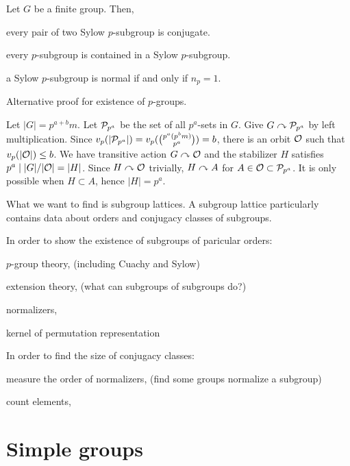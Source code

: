 \documentclass{../exp}
\begin{document}
\begin{cor}
Let $G$ be a finite group.
Then,
\begin{cond}
\item every pair of two Sylow $p$-subgroup is conjugate.
\item every $p$-subgroup is contained in a Sylow $p$-subgroup.
\item a Sylow $p$-subgroup is normal if and only if $n_p=1$.
\end{cond}
\end{cor}

\begin{thm}
Alternative proof for existence of $p$-groups.
\end{thm}
\begin{pf}
Let $|G|=p^{a+b}m$.
Let $\mathcal{P}_{p^a}$ be the set of all $p^a$-sets in $G$.
Give $G\curvearrowright\mathcal{P}_{p^a}$ by left multiplication.
Since $v_p(|\mathcal{P}_{p^a}|)=v_p({p^a(p^bm)\choose p^a})=b$, there is an orbit $\mathcal{O}$ such that $v_p(|\mathcal{O}|)\le b$.
We have transitive action $G\curvearrowright\mathcal{O}$ and the stabilizer $H$ satisfies $p^a\mid|G|/|\mathcal{O}|=|H|$.
Since $H\curvearrowright\mathcal{O}$ trivially, $H\curvearrowright A$ for $A\in\mathcal{O}\subset\mathcal{P}_{p^a}$.
It is only possible when $H\subset A$, hence $|H|=p^a$.
\end{pf}


What we want to find is subgroup lattices.
A subgroup lattice particularly contains data about orders and conjugacy classes of subgroups.

In order to show the existence of subgroups of paricular orders:
\begin{cond}
\item $p$-group theory, (including Cuachy and Sylow)
\item extension theory, (what can subgroups of subgroups do?)
\item normalizers,
\item kernel of permutation representation
\end{cond}

In order to find the size of conjugacy classes:
\begin{cond}
\item measure the order of normalizers, (find some groups normalize a subgroup)
\item count elements,
\end{cond}




\section{Simple groups}
\end{document}
